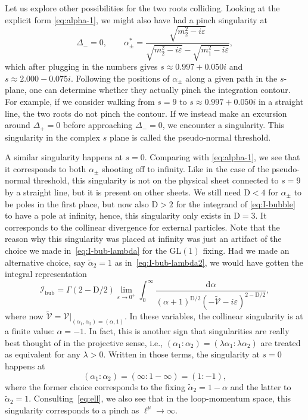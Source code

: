 \documentclass[12pt]{article}
\numberwithin{figure}{section}
\def \be {\begin{equation}}
\def \ee {\end{equation}}
\def \D {\mathrm{D}}
\def \d {\mathrm{d}}
\def \eps {\varepsilon}
\def \V {\mathcal{V}}
\def \I {\mathcal{I}}
\def \GL {\mathrm{GL}}
\def \bubble {\mathrm{bub}}
\begin{document}
	Let us explore other possibilities for the two roots colliding. Looking at the explicit form \eqref{eq:alpha-1}, we might also have had a pinch singularity at 
	\be\label{eq:alpha-pseudo}
	\Delta_- = 0, \qquad \alpha_\pm^\ast = \frac{\sqrt{m_2^2 - i\eps}}{\sqrt{m_2^2 - i\eps} - \sqrt{m_1^2 - i\eps}},
	\ee
	which after plugging in the numbers gives $s \approx 0.997 + 0.050i$ and $s \approx 2.000 - 0.075i$.
	Following the positions of $\alpha_\pm$ along a given path in the $s$-plane, one can determine whether they actually pinch the integration contour. For example, if we consider walking from $s=9$ to $s  \approx 0.997 + 0.050i$ in a straight line, the two roots do not pinch the contour. If we instead make an excursion around $\Delta_+ = 0$ before approaching $\Delta_- = 0$, we encounter a singularity. This singularity in the complex $s$ plane is called the pseudo-normal threshold.
	
	A similar singularity happens at $s=0$. Comparing with \eqref{eq:alpha-1}, we see that it corresponds to both $\alpha_\pm$ shooting off to infinity. Like in the case of the pseudo-normal threshold, this singularity is not on the physical sheet connected to $s=9$ by a straight line, but it is present on other sheets. We still need $\D<4$ for $\alpha_\pm$ to be poles in the first place, but now also $\D>2$ for the integrand of \eqref{eq:I-bubble} to have a pole at infinity, hence, this singularity only exists in $\D=3$. It corresponds to the collinear divergence for external particles. Note that the reason why this singularity was placed at infinity was just an artifact of the choice we made in~\eqref{eq:I-bub-lambda} for the $\GL(1)$ fixing. Had we made an alternative choice, say $\tilde{\alpha}_2 = 1$ as in~\eqref{eq:I-bub-lambda2}, we would have gotten the integral representation
	\be
	\I_\bubble = \Gamma(2{-}\D/2) \lim_{\eps \to 0^+} \int_{0}^{\infty} \frac{\d\alpha}{(\alpha + 1)^{\D/2}( -\tilde{\V} - i\eps)^{2-\D/2}},
	\ee
	where now $\tilde{\V} = \V|_{(\alpha_1,\alpha_2) = (\alpha,1)}$. In these variables, the collinear singularity is at a finite value: $\alpha = -1$. In fact, this is another sign that singularities are really best thought of in the projective sense, i.e., $(\alpha_1 : \alpha_2) = (\lambda \alpha_1 : \lambda \alpha_2)$ are treated as equivalent for any $\lambda > 0$. Written in those terms, the singularity at $s=0$ happens at
	\be\label{eq:bubble-2nd}
	(\alpha_1 : \alpha_2) = (\infty : 1{-}\infty) = (1 : -1),
	\ee
	where the former choice corresponds to the fixing $\tilde{\alpha}_2 = 1-\alpha$ and the latter to $\tilde{\alpha}_2 = 1$. Consulting~\eqref{eq:ell}, we also see that in the loop-momentum space, this singularity corresponds to a pinch as $\ell^\mu \to \infty$.
	
\end{document}

